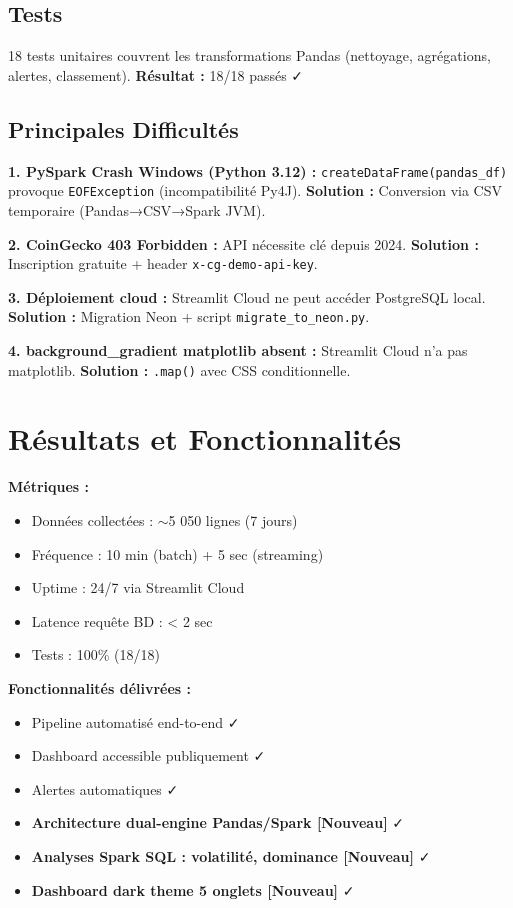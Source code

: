 \documentclass[11pt,a4paper]{article}
\begin{document}
\subsection{Tests}
18 tests unitaires couvrent les transformations Pandas (nettoyage, agrégations, alertes, classement). \textbf{Résultat :} 18/18 passés ✓

\subsection{Principales Difficultés}

\textbf{1. PySpark Crash Windows (Python 3.12) :} \texttt{createDataFrame(pandas\_df)} provoque \texttt{EOFException} (incompatibilité Py4J). \textbf{Solution :} Conversion via CSV temporaire (Pandas→CSV→Spark JVM).

\textbf{2. CoinGecko 403 Forbidden :} API nécessite clé depuis 2024. \textbf{Solution :} Inscription gratuite + header \texttt{x-cg-demo-api-key}.

\textbf{3. Déploiement cloud :} Streamlit Cloud ne peut accéder PostgreSQL local. \textbf{Solution :} Migration Neon + script \texttt{migrate\_to\_neon.py}.

\textbf{4. background\_gradient matplotlib absent :} Streamlit Cloud n'a pas matplotlib. \textbf{Solution :} \texttt{.map()} avec CSS conditionnelle.

\section{Résultats et Fonctionnalités}

\textbf{Métriques :}
\begin{itemize}[noitemsep]
    \item Données collectées : $\sim$5 050 lignes (7 jours)
    \item Fréquence : 10 min (batch) + 5 sec (streaming)
    \item Uptime : 24/7 via Streamlit Cloud
    \item Latence requête BD : < 2 sec
    \item Tests : 100\% (18/18)
\end{itemize}

\textbf{Fonctionnalités délivrées :}
\begin{itemize}[noitemsep]
    \item Pipeline automatisé end-to-end ✓
    \item Dashboard accessible publiquement ✓
    \item Alertes automatiques ✓
    \item \textbf{Architecture dual-engine Pandas/Spark [Nouveau]} ✓
    \item \textbf{Analyses Spark SQL : volatilité, dominance [Nouveau]} ✓
    \item \textbf{Dashboard dark theme 5 onglets [Nouveau]} ✓
\end{itemize}
\end{document}
